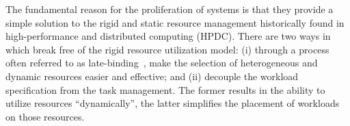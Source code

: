 \documentclass{sig-alternate}
\begin{document}



The fundamental reason for the proliferation of \pilotjob systems is that
they provide a simple solution to the rigid and static resource management
historically found in high-performance and distributed computing (HPDC).  There
are two ways in which \pilotjobs break free of the rigid resource utilization
model: (i) through a process often referred to as
late-binding~\cite{latebinding}, \pilotjobs make the selection of heterogeneous
and dynamic resources easier and effective; and (ii) \pilotjobs decouple the
workload specification from the task management.  The former results in the
ability to utilize resources ``dynamically'', the latter simplifies the
placement of workloads on those resources.



\end{document}
